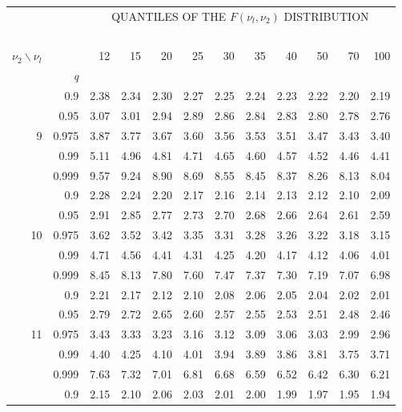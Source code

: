 \documentclass[12pt,a4paper,openany,twoside]{report}
\theoremstyle{definition}
\theoremstyle{remark}
\theoremstyle{plain}
\theoremstyle{definition}
\theoremstyle{definition}
\theoremstyle{definition}
\theoremstyle{remark}
\begin{document}
\newpage

\begin{center}
\begin{tabular}{rr@{\ \ }r@{\ \ }r@{\ \ }r@{\ \ }r@{\ \ }r@{\ \ }r@{\ \ }r@{\ \ }r@{\ \ }r@{\ \ }r@{ }}
& &\multicolumn{10}{c}{QUANTILES OF THE $F(\nu_l, \nu_2)$ DISTRIBUTION}\\
\ \\
$\nu_2\backslash\nu_l$ & & 12 & 15 & 20 & 25 & 30 & 35 & 40 & 50 & 70 & 100\\
 & \textit{q}  &  &  &  &  &  &  &  &  & & \\
\rule{0pt}{2.5ex} & 0.9 & 2.38 & 2.34 & 2.30 & 2.27 & 2.25 & 2.24 & 2.23 & 2.22 & 2.20 & 2.19\\
 & 0.95 & 3.07 & 3.01 & 2.94 & 2.89 & 2.86 & 2.84 & 2.83 & 2.80 & 2.78 & 2.76\\
9 & 0.975 & 3.87 & 3.77 & 3.67 & 3.60 & 3.56 & 3.53 & 3.51 & 3.47 & 3.43 & 3.40\\
 & 0.99 & 5.11 & 4.96 & 4.81 & 4.71 & 4.65 & 4.60 & 4.57 & 4.52 & 4.46 & 4.41\\
 & 0.999 & 9.57 & 9.24 & 8.90 & 8.69 & 8.55 & 8.45 & 8.37 & 8.26 & 8.13 & 8.04\\
\rule{0pt}{2.5ex} & 0.9 & 2.28 & 2.24 & 2.20 & 2.17 & 2.16 & 2.14 & 2.13 & 2.12 & 2.10 & 2.09\\
 & 0.95 & 2.91 & 2.85 & 2.77 & 2.73 & 2.70 & 2.68 & 2.66 & 2.64 & 2.61 & 2.59\\
10 & 0.975 & 3.62 & 3.52 & 3.42 & 3.35 & 3.31 & 3.28 & 3.26 & 3.22 & 3.18 & 3.15\\
 & 0.99 & 4.71 & 4.56 & 4.41 & 4.31 & 4.25 & 4.20 & 4.17 & 4.12 & 4.06 & 4.01\\
 & 0.999 & 8.45 & 8.13 & 7.80 & 7.60 & 7.47 & 7.37 & 7.30 & 7.19 & 7.07 & 6.98\\
\rule{0pt}{2.5ex} & 0.9 & 2.21 & 2.17 & 2.12 & 2.10 & 2.08 & 2.06 & 2.05 & 2.04 & 2.02 & 2.01\\
 & 0.95 & 2.79 & 2.72 & 2.65 & 2.60 & 2.57 & 2.55 & 2.53 & 2.51 & 2.48 & 2.46\\
11 & 0.975 & 3.43 & 3.33 & 3.23 & 3.16 & 3.12 & 3.09 & 3.06 & 3.03 & 2.99 & 2.96\\
 & 0.99 & 4.40 & 4.25 & 4.10 & 4.01 & 3.94 & 3.89 & 3.86 & 3.81 & 3.75 & 3.71\\
 & 0.999 & 7.63 & 7.32 & 7.01 & 6.81 & 6.68 & 6.59 & 6.52 & 6.42 & 6.30 & 6.21\\
\rule{0pt}{2.5ex} & 0.9 & 2.15 & 2.10 & 2.06 & 2.03 & 2.01 & 2.00 & 1.99 & 1.97 & 1.95 & 1.94\\

\end{tabular}
\end{center}
\end{document}
